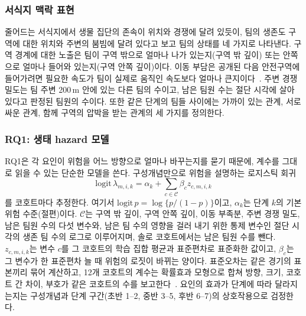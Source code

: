 \subsubsection{서식지 맥락 표현}
\label{sec:method:representation}
줄어드는 서식지에서 생물 집단의 존속이 위치와 경쟁에 달려 있듯이, 팀의 생존도 구역에 대한 위치와 주변의 붐빔에 달려 있다고 보고 팀의 상태를 네 가지로 나타낸다.
구역 경계에 대한 노출은 팀이 구역 밖으로 얼마나 나가 있는지(구역 밖 깊이) 또는 안쪽으로 얼마나 들어와 있는지(구역 안쪽 깊이)이다.
이동 부담은 공개된 다음 안전구역에 들어가려면 필요한 속도가 팀이 실제로 움직인 속도보다 얼마나 큰지이다~\cite{Nathan08}.
주변 경쟁 밀도는 팀 주변 200\,m 안에 있는 다른 팀의 수이고, 남은 팀원 수는 절단 시각에 살아 있다고 판정된 팀원의 수이다.
또한 같은 단계의 팀들 사이에는 가까이 있는 관계, 서로 싸운 관계, 함께 구역의 압박을 받는 관계의 세 가지를 정의한다.

\subsubsection{RQ1: 생태 hazard 모델}
\label{sec:method:rq1}
RQ1은 각 요인이 위험을 어느 방향으로 얼마나 바꾸는지를 묻기 때문에, 계수를 그대로 읽을 수 있는 단순한 모델을 쓴다.
구성개념만으로 위험을 설명하는 로지스틱 회귀
\begin{equation}
\mathrm{logit}\,\lambda_{m,i,k}=\alpha_k+\textstyle\sum_{c\in\mathcal{C}}\beta_c z_{c,m,i,k}
\label{eq:ehm}
\end{equation}
를 코호트마다 추정한다.
여기서 $\mathrm{logit}\,p=\log\{p/(1-p)\}$이고, $\alpha_k$는 단계 $k$의 기본 위험 수준(절편)이다.
$\mathcal{C}$는 구역 밖 깊이, 구역 안쪽 깊이, 이동 부족분, 주변 경쟁 밀도, 남은 팀원 수의 다섯 변수와, 남은 팀 수의 영향을 걸러 내기 위한 통제 변수인 절단 시각의 생존 팀 수의 로그로 이루어지며, 솔로 코호트에서는 남은 팀원 수를 뺀다.
$z_{c,m,i,k}$는 변수 $c$를 그 코호트의 학습 집합 평균과 표준편차로 표준화한 값이고, $\beta_c$는 그 변수가 한 표준편차 늘 때 위험의 로짓이 바뀌는 양이다.
표준오차는 같은 경기의 표본끼리 묶어 계산하고, 12개 코호트의 계수는 확률효과 모형으로 합쳐 방향, 크기, 코호트 간 차이, 부호가 같은 코호트의 수를 보고한다~\cite{DerSimonian86}.
요인의 효과가 단계에 따라 달라지는지는 구성개념과 단계 구간(초반 1--2, 중반 3--5, 후반 6--7)의 상호작용으로 검정한다.

